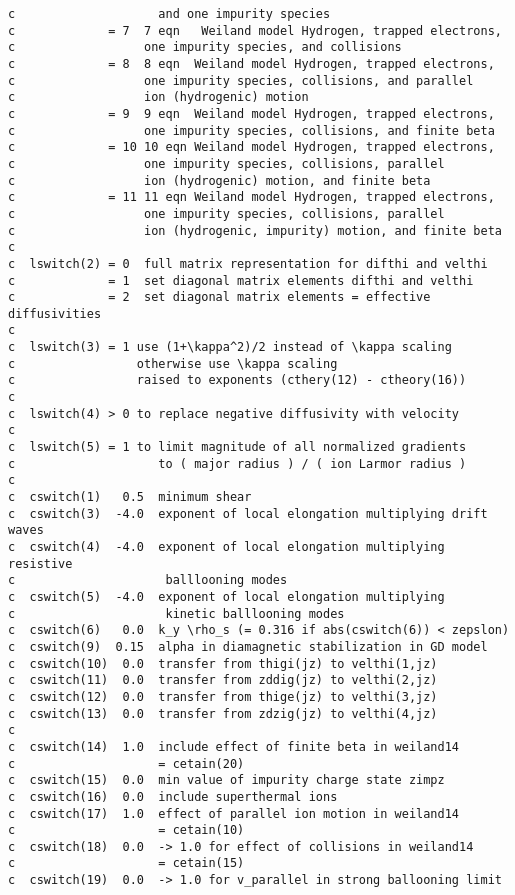 \begin{verbatim}
c                    and one impurity species
c             = 7  7 eqn   Weiland model Hydrogen, trapped electrons,
c                  one impurity species, and collisions
c             = 8  8 eqn  Weiland model Hydrogen, trapped electrons,
c                  one impurity species, collisions, and parallel
c                  ion (hydrogenic) motion
c             = 9  9 eqn  Weiland model Hydrogen, trapped electrons,
c                  one impurity species, collisions, and finite beta
c             = 10 10 eqn Weiland model Hydrogen, trapped electrons,
c                  one impurity species, collisions, parallel
c                  ion (hydrogenic) motion, and finite beta
c             = 11 11 eqn Weiland model Hydrogen, trapped electrons,
c                  one impurity species, collisions, parallel
c                  ion (hydrogenic, impurity) motion, and finite beta
c
c  lswitch(2) = 0  full matrix representation for difthi and velthi
c             = 1  set diagonal matrix elements difthi and velthi
c             = 2  set diagonal matrix elements = effective diffusivities
c
c  lswitch(3) = 1 use (1+\kappa^2)/2 instead of \kappa scaling
c                 otherwise use \kappa scaling
c                 raised to exponents (cthery(12) - ctheory(16))
c
c  lswitch(4) > 0 to replace negative diffusivity with velocity
c
c  lswitch(5) = 1 to limit magnitude of all normalized gradients
c                    to ( major radius ) / ( ion Larmor radius )
c
c  cswitch(1)   0.5  minimum shear
c  cswitch(3)  -4.0  exponent of local elongation multiplying drift waves
c  cswitch(4)  -4.0  exponent of local elongation multiplying resistive
c                     balllooning modes
c  cswitch(5)  -4.0  exponent of local elongation multiplying
c                     kinetic balllooning modes
c  cswitch(6)   0.0  k_y \rho_s (= 0.316 if abs(cswitch(6)) < zepslon)
c  cswitch(9)  0.15  alpha in diamagnetic stabilization in GD model
c  cswitch(10)  0.0  transfer from thigi(jz) to velthi(1,jz)
c  cswitch(11)  0.0  transfer from zddig(jz) to velthi(2,jz)
c  cswitch(12)  0.0  transfer from thige(jz) to velthi(3,jz)
c  cswitch(13)  0.0  transfer from zdzig(jz) to velthi(4,jz)
c
c  cswitch(14)  1.0  include effect of finite beta in weiland14
c                    = cetain(20)
c  cswitch(15)  0.0  min value of impurity charge state zimpz
c  cswitch(16)  0.0  include superthermal ions
c  cswitch(17)  1.0  effect of parallel ion motion in weiland14
c                    = cetain(10)
c  cswitch(18)  0.0  -> 1.0 for effect of collisions in weiland14
c                    = cetain(15)
c  cswitch(19)  0.0  -> 1.0 for v_parallel in strong ballooning limit

\end{verbatim}
